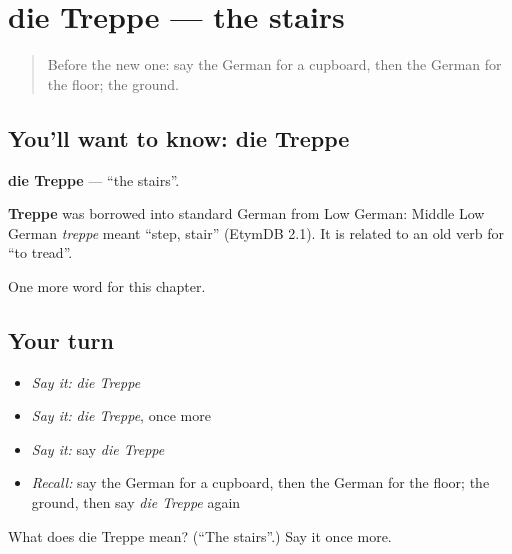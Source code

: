 \section[die Treppe]{die Treppe — the stairs}

\label{lesson:GE-C78-treppe}



\begin{quote}
Before the new one: say the German for a cupboard, then the German for the floor; the ground.
\end{quote}

\subsection*{You'll want to know: die Treppe}
\textbf{die Treppe} — \textquotedblleft{}the stairs\textquotedblright{}.

\begin{cousinweb}
\textbf{Treppe} was borrowed into standard German from Low German: Middle Low German \emph{treppe} meant \textquotedblleft{}step, stair\textquotedblright{} (EtymDB 2.1). It is related to an old verb for \textquotedblleft{}to tread\textquotedblright{}.
\end{cousinweb}

\begin{grammarlens}[title={What you've built}]
One more word for this chapter.
\end{grammarlens}

\subsection*{Your turn}
\begin{itemize}
\raggedright
  \item \emph{Say it:} \emph{die Treppe}
  \item \emph{Say it:} \emph{die Treppe}, once more
  \item \emph{Say it:} say \emph{die Treppe}
  \item \emph{Recall:} say the German for a cupboard, then the German for the floor; the ground, then say \emph{die Treppe} again
\end{itemize}

\begin{tcolorbox}[breakable,colback=teal!4,colframe=teal!35!black,title={Before you move on}]
What does die Treppe mean? (\textquotedblleft{}The stairs\textquotedblright{}.) Say it once more.
\end{tcolorbox}

